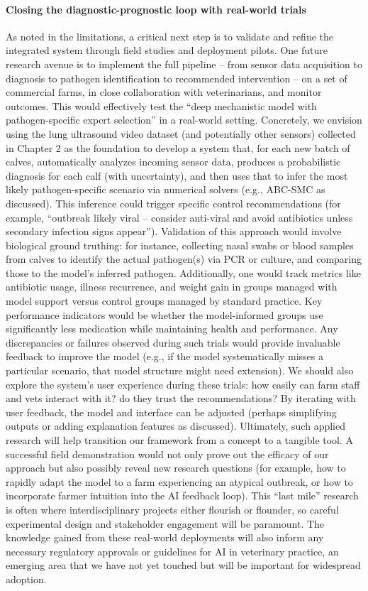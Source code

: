 \paragraph{Closing the diagnostic-prognostic loop with real-world trials} As noted in the limitations, a critical next step is to validate and refine the integrated system through field studies and deployment pilots. One future research avenue is to implement the full pipeline – from sensor data acquisition to diagnosis to pathogen identification to recommended intervention – on a set of commercial farms, in close collaboration with veterinarians, and monitor outcomes. This would effectively test the “deep mechanistic model with pathogen-specific expert selection” in a real-world setting. Concretely, we envision using the lung ultrasound video dataset (and potentially other sensors) collected in Chapter 2 as the foundation to develop a system that, for each new batch of calves, automatically analyzes incoming sensor data, produces a probabilistic diagnosis for each calf (with uncertainty), and then uses that to infer the most likely pathogen-specific scenario via numerical solvers (e.g., ABC-SMC as discussed). This inference could trigger specific control recommendations (for example, “outbreak likely viral – consider anti-viral and avoid antibiotics unless secondary infection signs appear”). Validation of this approach would involve biological ground truthing: for instance, collecting nasal swabs or blood samples from calves to identify the actual pathogen(s) via PCR or culture, and comparing those to the model’s inferred pathogen. Additionally, one would track metrics like antibiotic usage, illness recurrence, and weight gain in groups managed with model support versus control groups managed by standard practice. Key performance indicators would be whether the model-informed groups use significantly less medication while maintaining health and performance. Any discrepancies or failures observed during such trials would provide invaluable feedback to improve the model (e.g., if the model systematically misses a particular scenario, that model structure might need extension). We should also explore the system’s user experience during these trials: how easily can farm staff and vets interact with it? do they trust the recommendations? By iterating with user feedback, the model and interface can be adjusted (perhaps simplifying outputs or adding explanation features as discussed). Ultimately, such applied research will help transition our framework from a concept to a tangible tool. A successful field demonstration would not only prove out the efficacy of our approach but also possibly reveal new research questions (for example, how to rapidly adapt the model to a farm experiencing an atypical outbreak, or how to incorporate farmer intuition into the AI feedback loop). This “last mile” research is often where interdisciplinary projects either flourish or flounder, so careful experimental design and stakeholder engagement will be paramount. The knowledge gained from these real-world deployments will also inform any necessary regulatory approvals or guidelines for AI in veterinary practice, an emerging area that we have not yet touched but will be important for widespread adoption.

